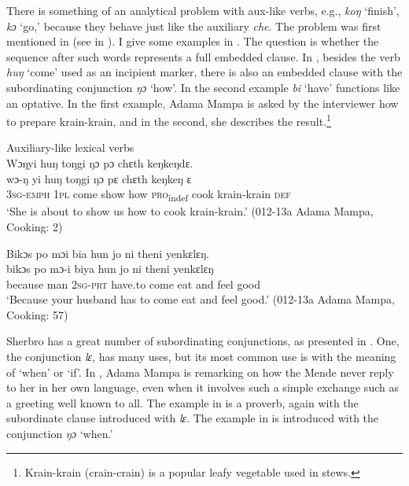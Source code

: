 There is something of an analytical problem with aux-like verbs, e.g., \textit{koŋ} ‘finish', \textit{kɔ} ‘go,' because they behave just like the auxiliary \textit{che}. The problem was first mentioned in  (see  in ). I give some examples in . The question is whether the sequence after such words represents a full embedded clause. In , besides the verb \textit{huŋ} ‘come' used as an incipient marker, there is also an embedded clause with the subordinating conjunction \textit{ŋɔ} ‘how'. In the second example \textit{bi} ‘have' functions like an optative. In the first example, Adama Mampa is asked by the interviewer how to prepare krain-krain, and in the second, she describes the result.\footnote{Krain-krain (crain-crain) is a popular leafy vegetable used in stews.}

\ea%
    \label{ex:234}
    Auxiliary-like lexical verbs\\
    \ea Wɔŋyi huŋ toŋgi ŋɔ pɔ chɛth keŋkeŋdɛ.\\
    \gll wɔ{}-ŋ      yi    huŋ    toŋgi    ŋɔ    pɛ      chɛth    keŋkeŋ      ɛ\\
    \textsc{3sg-emph}  \textsc{1pl}  come    show    how  \textsc{pro}\textsubscript{indef}  cook    krain-krain    \textsc{def}\\
    \glt ‘She is about to show us how to cook krain-krain.' (012-13a Adama Mampa, Cooking: 2)

    \ex Bikɔs  po  mɔi bia hun jo ni theni yenkɛlɛŋ.\\
    \gll bikɔs    po    mɔ-i      biya    hun    jo    ni    theni    yenkɛlɛŋ\\
    because  man  \textsc{2sg-prt}    have.to  come    eat    and  feel    good\\
    \glt ‘Because your husband has to come eat and feel good.' (012-13a Adama Mampa, Cooking: 57)
\z
\z

Sherbro has a great number of subordinating conjunctions, as presented in . One, the conjunction \textit{lɛ}, has many uses, but its most common use is with the meaning of ‘when' or ‘if'. In , Adama Mampa is remarking on how the Mende never reply to her in her own language, even when it involves such a simple exchange such as a greeting well known to all. The example in  is a proverb, again with the subordinate clause introduced with \textit{lɛ}. The example in  is introduced with the conjunction \textit{ŋɔ} ‘when.'

